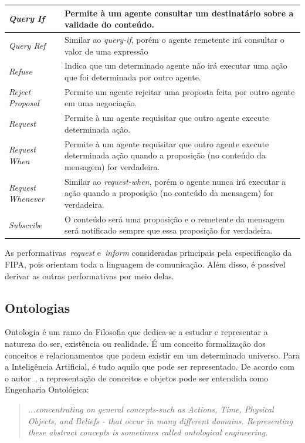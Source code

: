 \begin{table}
\begin{tabular}{|p{3cm} | p{12cm} |}
		\hline
		\emph{Query If} & Permite à um agente consultar um destinatário sobre a validade do conteúdo.	\\
		\hline
		\emph{Query Ref} & Similar ao \emph{query-if}, porém o agente remetente irá consultar o valor de uma expressão	\\
		\hline
		\emph{Refuse} & Indica que um determinado agente não irá executar uma ação que foi determinada por outro agente.	\\
		\hline
		\emph{Reject Proposal} & Permite um agente rejeitar uma proposta feita por outro agente em uma negociação.	\\
		\hline
		\emph{Request} & Permite à um agente requisitar que outro agente execute determinada ação.	\\
		\hline
		\emph{Request When} & Permite à um agente requisitar que outro agente execute determinada ação quando a proposição (no conteúdo da mensagem) for verdadeira.	\\
		\hline
		\emph{Request Whenever} & Similar ao \emph{request-when}, porém o agente nunca irá executar a ação quando a proposição (no conteúdo da mensagem) for verdadeira.	\\
		\hline
		\emph{Subscribe} & O conteúdo será uma proposição e o remetente da mensagem será notificado sempre que essa proposição for verdadeira.	\\
		\hline
	\end{tabular}
	\label{table:fipa-cal-spec}
\end{table}

As performativas~\emph{request} e~\emph{inform} consideradas principais pela especificação da FIPA, pois orientam toda a linguagem de comunicação. Além disso, é possível derivar as outras performativas por meio delas.


\subsection{Ontologias}

Ontologia é um ramo da Filosofia que dedica-se a estudar e representar a natureza do ser, existência ou realidade. É um conceito formalização dos conceitos e relacionamentos que podem existir em um determinado universo. Para a Inteligência Artificial, é tudo aquilo que pode ser representado. De acordo com o autor~\cite{novig95}, a representação de conceitos e objetos pode ser entendida como Engenharia Ontológica:

\begin{quote}
\emph{...concentrating on general concepts-such as Actions, Time, Physical Objects, and Beliefs - that occur in many different domains. Representing these abstract concepts is sometimes called ontological engineering.}
\end{quote}

